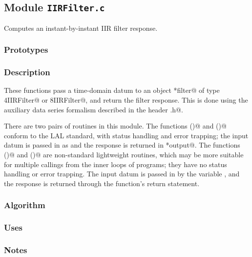 
\subsection{Module \texttt{IIRFilter.c}}

Computes an instant-by-instant IIR filter response.

\subsubsection{Prototypes}
\vspace{0.1in}


\subsubsection{Description}

These functions pass a time-domain datum to an object \verb@*filter@
of type \verb@REAL4IIRFilter@ or \verb@REAL8IIRFilter@, and return the
filter response.  This is done using the auxiliary data series
formalism described in the header \verb@IIRFilter.h@.

There are two pairs of routines in this module.  The functions
()@ and ()@ conform to the LAL
standard, with status handling and error trapping; the input datum is
passed in as \verb@input@ and the response is returned in
\verb@*output@.  The functions \verb@SIIRFilter()@ and
\verb@DIIRFilter()@ are non-standard lightweight routines, which may
be more suitable for multiple callings from the inner loops of
programs; they have no status handling or error trapping.  The input
datum is passed in by the variable \verb@x@, and the response is
returned through the function's return statement.

\subsubsection{Algorithm}

\subsubsection{Uses}

\subsubsection{Notes}

